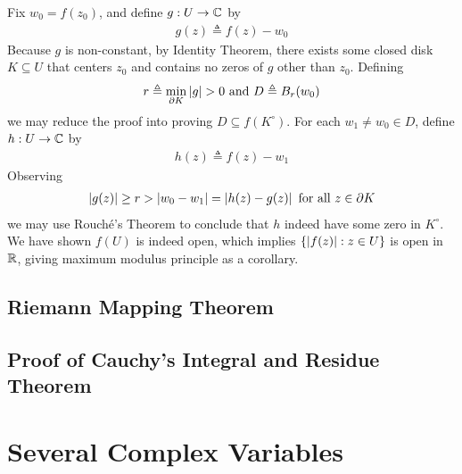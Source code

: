 \documentclass{report}
\begin{document}
Fix $w_0=f(z_0)$, and define $g:U\rightarrow \mathbb{C}$ by 
\begin{align*}
g(z)\triangleq f(z)- w_0
\end{align*}
Because $g$ is non-constant, by Identity Theorem, there exists some closed disk $K \subseteq U$ that centers $z_0$ and contains no zeros of $g$ other than  $z_0$.   
Defining
\begin{align*}
r\triangleq \min_{\partial K}\abso{g}>0\text{ and }D\triangleq B_r(w_0)
\end{align*}
we may reduce the proof into proving $D \subseteq f(K^{\circ })$. For each $w_1 \neq w_0\in D$, define $h:U\rightarrow \mathbb{C}$ by 
\begin{align*}
h(z)\triangleq f(z)-w_1
\end{align*}
Observing  
\begin{align*}
\left|g(z)\right|\geq r> \left|w_0 - w_1\right|= \left|h(z)-g(z)\right|\text{ for all }z\in \partial K
\end{align*}
we may use Rouché's Theorem  to conclude that $h$ indeed have some zero in $K^{\circ }$. We have shown $f(U)$ is indeed open, which implies $\{ \left|f(z)\right|: z \in U \}$ is open in $\mathbb{R}$, giving maximum modulus principle as a corollary.  
\section{Riemann Mapping Theorem}
\section{Proof of Cauchy's Integral and Residue Theorem}
\label{CITA}
\chapter{Several Complex Variables}
\end{document}
